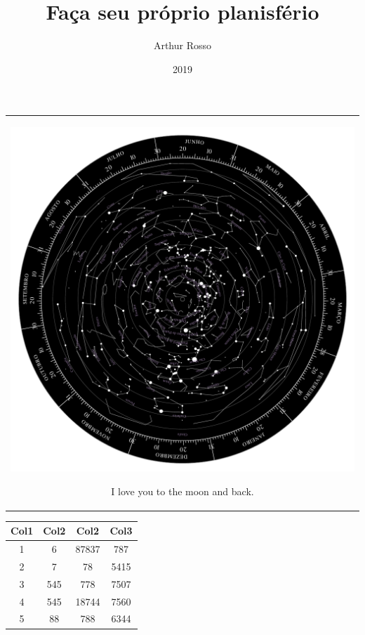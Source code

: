 \documentclass[a4paper, portrait, margin = 2.2em]{article}
\title{Faça seu próprio planisfério}
\author{Arthur Rosso}
\date{2019}
\begin{document}
\thispagestyle{empty}
\begin{center}
\begin{tabular}{ | c | } 
    \hline
    \centerline{\includegraphics{tmp/starwheel}}

    \centerline{I love you to the moon and back.}
    
\end{tabular}
\end{center}

\begin{center}
    \begin{tabular}{||c c c c||} 
    \hline
    Col1 & Col2 & Col2 & Col3 \\ [0.5ex] 
    \hline\hline
    1 & 6 & 87837 & 787 \\ 
    \hline
    2 & 7 & 78 & 5415 \\
    \hline
    3 & 545 & 778 & 7507 \\
    \hline
    4 & 545 & 18744 & 7560 \\
    \hline
    5 & 88 & 788 & 6344 \\ [1ex] 
    \hline
   \end{tabular}
   \end{center}
\end{document}
